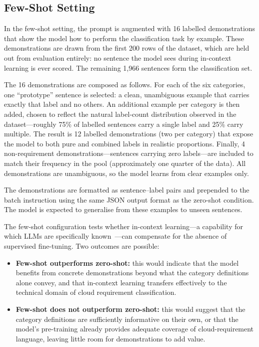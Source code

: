 \subsection{Few-Shot Setting}

In the few-shot setting, the prompt is augmented with 16 labelled demonstrations that show the model how to perform the classification task by example. These demonstrations are drawn from the first 200 rows of the dataset, which are held out from evaluation entirely: no sentence the model sees during in-context learning is ever scored. The remaining 1,966 sentences form the classification set.

The 16 demonstrations are composed as follows. For each of the six categories, one ``prototype'' sentence is selected: a clean, unambiguous example that carries exactly that label and no others. An additional example per category is then added, chosen to reflect the natural label-count distribution observed in the dataset—roughly 75\% of labelled sentences carry a single label and 25\% carry multiple. The result is 12 labelled demonstrations (two per category) that expose the model to both pure and combined labels in realistic proportions. Finally, 4 non-requirement demonstrations—sentences carrying zero labels—are included to match their frequency in the pool (approximately one quarter of the data). All demonstrations are unambiguous, so the model learns from clear examples only.

The demonstrations are formatted as sentence–label pairs and prepended to the batch instruction using the same JSON output format as the zero-shot condition. The model is expected to generalise from these examples to unseen sentences.

The few-shot configuration tests whether in-context learning—a capability for which LLMs are specifically known~\cite{brown2020gpt3}—can compensate for the absence of supervised fine-tuning. Two outcomes are possible:

\begin{itemize}
    \item \textbf{Few-shot outperforms zero-shot:} this would indicate that the model benefits from concrete demonstrations beyond what the category definitions alone convey, and that in-context learning transfers effectively to the technical domain of cloud requirement classification.
    \item \textbf{Few-shot does not outperform zero-shot:} this would suggest that the category definitions are sufficiently informative on their own, or that the model's pre-training already provides adequate coverage of cloud-requirement language, leaving little room for demonstrations to add value.
\end{itemize}

